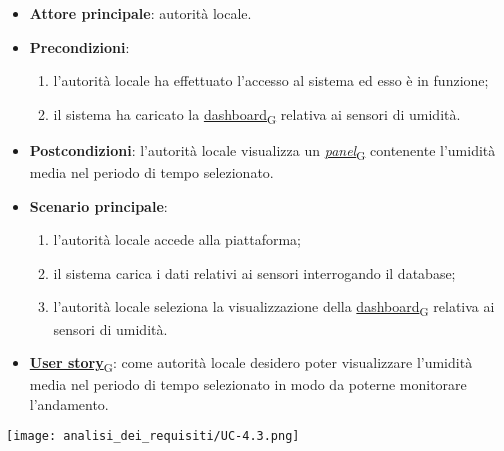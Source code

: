 \begin{itemize}
	\item \textbf{Attore principale}: autorità locale.
	\item \textbf{Precondizioni}:
	      \begin{enumerate}
		      \item l'autorità locale ha effettuato l'accesso al sistema ed esso è in funzione;
		      \item il sistema ha caricato la \href{https://7last.github.io/docs/pb/documentazione-interna/glossario\#dashboard}{dashboard\textsubscript{G}} relativa ai sensori di umidità.
	      \end{enumerate}
	\item \textbf{Postcondizioni}: l'autorità locale visualizza un \href{https://7last.github.io/docs/pb/documentazione-interna/glossario\#panel}{\textit{panel}\textsubscript{G}} contenente l'umidità media nel periodo di tempo selezionato.
	\item \textbf{Scenario principale}:
	      \begin{enumerate}
		      \item l'autorità locale accede alla piattaforma;
		      \item il sistema carica i dati relativi ai sensori interrogando il database;
		      \item l'autorità locale seleziona la visualizzazione della \href{https://7last.github.io/docs/pb/documentazione-interna/glossario\#dashboard}{dashboard\textsubscript{G}} relativa ai sensori di umidità.
	      \end{enumerate}
	\item \href{https://7last.github.io/docs/pb/documentazione-interna/glossario\#user-story}{\textbf{User story}\textsubscript{G}}: come autorità locale desidero poter visualizzare l'umidità media nel periodo di tempo selezionato
	      in modo da poterne monitorare l'andamento.
\end{itemize}
\begin{center}
	\texttt{[image: analisi\_dei\_requisiti/UC-4.3.png]}
\end{center}


